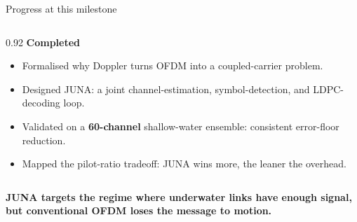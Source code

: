 \documentclass[aspectratio=169,10pt]{beamer}
\begin{document}
\begin{frame}{Progress at this milestone}
  \begin{columns}[T,onlytextwidth]
    \begin{column}{0.92\textwidth}
      \textbf{Completed}
      \begin{itemize}\setlength{\itemsep}{0.55em}
        \item Formalised why Doppler turns OFDM into a coupled-carrier problem.
        \item Designed JUNA: a joint channel-estimation, symbol-detection, and LDPC-decoding loop.
        \item Validated on a \textbf{60-channel} shallow-water ensemble: consistent error-floor reduction.
        \item Mapped the pilot-ratio tradeoff: JUNA wins more, the leaner the overhead.
      \end{itemize}
    \end{column}
  \end{columns}
  \vspace{0.6cm}
  \begin{center}
    \large\bfseries\color{accent}
    JUNA targets the regime where underwater links have enough signal,\\
    but conventional OFDM loses the message to motion.
  \end{center}
\end{frame}
\end{document}
